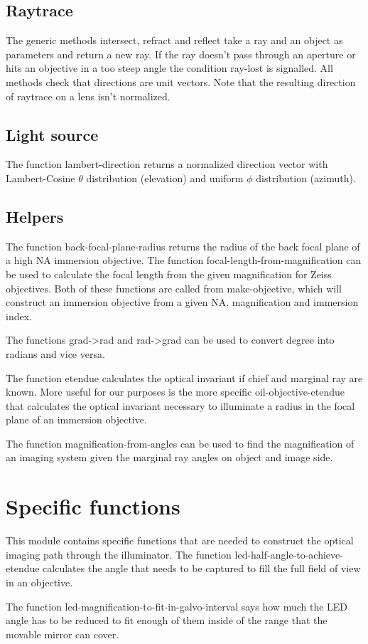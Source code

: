 \documentclass[twocolumn,DIV20]{scrartcl}
\begin{document}
\subsection{Raytrace}
The generic methods intersect, refract and reflect take a ray and an
object as parameters and return a new ray. If the ray doesn't pass
through an aperture or hits an objective in a too steep angle the
condition ray-lost is signalled. All methods check that directions are
unit vectors. Note that the resulting direction of raytrace on a lens
isn't normalized.
\subsection{Light source}
The function lambert-direction returns a normalized direction vector
with Lambert-Cosine $\theta$ distribution (elevation) and uniform
$\phi$ distribution (azimuth).
\subsection{Helpers}
The function back-focal-plane-radius returns the radius of the back
focal plane of a high NA immersion objective. The function
focal-length-from-magnification can be used to calculate the focal
length from the given magnification for Zeiss objectives. Both of
these functions are called from make-objective, which will construct
an immersion objective from a given NA, magnification and immersion
index.

The functions grad->rad and rad->grad can be used to convert degree
into radians and vice versa.

The function etendue calculates the optical invariant if chief and
marginal ray are known. More useful for our purposes is the more
specific oil-objective-etendue that calculates the optical invariant
necessary to illuminate a radius in the focal plane of an immersion
objective.

The function magnification-from-angles can be used to find the
magnification of an imaging system given the marginal ray angles on
object and image side.

\section{Specific functions}
This module contains specific functions that are needed to construct
the optical imaging path through the illuminator. The function
led-half-angle-to-achieve-etendue calculates the angle that needs to
be captured to fill the full field of view in an objective.

The function led-magnification-to-fit-in-galvo-interval says how much
the LED angle has to be reduced to fit enough of them inside of the
range that the movable mirror can cover.
\end{document}
